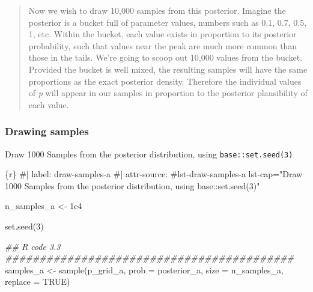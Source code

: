 \documentclass[
  letterpaper,
  DIV=11,
  numbers=noendperiod]{scrreprt}
\newenvironment{Shaded}{\begin{snugshade}}{\end{snugshade}}
\newcommand{\AttributeTok}[1]{\textcolor[rgb]{0.40,0.45,0.13}{#1}}
\newcommand{\CommentTok}[1]{\textcolor[rgb]{0.37,0.37,0.37}{#1}}
\newcommand{\ConstantTok}[1]{\textcolor[rgb]{0.56,0.35,0.01}{#1}}
\newcommand{\DecValTok}[1]{\textcolor[rgb]{0.68,0.00,0.00}{#1}}
\newcommand{\DocumentationTok}[1]{\textcolor[rgb]{0.37,0.37,0.37}{\textit{#1}}}
\newcommand{\FloatTok}[1]{\textcolor[rgb]{0.68,0.00,0.00}{#1}}
\newcommand{\FunctionTok}[1]{\textcolor[rgb]{0.28,0.35,0.67}{#1}}
\newcommand{\InformationTok}[1]{\textcolor[rgb]{0.37,0.37,0.37}{#1}}
\newcommand{\NormalTok}[1]{\textcolor[rgb]{0.00,0.23,0.31}{#1}}
\newcommand{\OtherTok}[1]{\textcolor[rgb]{0.00,0.23,0.31}{#1}}
\newcommand*\circled[1]{\tikz[baseline=(char.base)]{
          \node[shape=circle,draw,inner sep=1pt] (char) {{\scriptsize#1}};}}
\begin{document}
\begin{quote}
Now we wish to draw 10,000 samples from this posterior. Imagine the
posterior is a bucket full of parameter values, numbers such as 0.1,
0.7, 0.5, 1, etc. Within the bucket, each value exists in proportion to
its posterior probability, such that values near the peak are much more
common than those in the tails. We're going to scoop out 10,000 values
from the bucket. Provided the bucket is well mixed, the resulting
samples will have the same proportions as the exact posterior density.
Therefore the individual values of \emph{p} will appear in our samples
in proportion to the posterior plausibility of each value.
\end{quote}

\hypertarget{drawing-samples}{%
\subsubsection{Drawing samples}\label{drawing-samples}}

\begin{codelisting}[H]

\caption{Draw 1000 Samples from the posterior distribution, using
\texttt{base::set.seed(3)}}

\hypertarget{lst-draw-samples-a}{%
\label{lst-draw-samples-a}}%
\begin{Shaded}
\begin{Highlighting}[]
\InformationTok{\textasciigrave{}\textasciigrave{}\textasciigrave{}\{r\}}
\CommentTok{\#| label: draw{-}samples{-}a}
\CommentTok{\#| attr{-}source: \textquotesingle{}\#lst{-}draw{-}samples{-}a lst{-}cap="Draw 1000 Samples from the posterior distribution, using \textasciigrave{}base::set.seed(3)\textasciigrave{}"\textquotesingle{}}

\NormalTok{n\_samples\_a }\OtherTok{\textless{}{-}} \FloatTok{1e4}

\FunctionTok{set.seed}\NormalTok{(}\DecValTok{3}\NormalTok{) }\hspace*{\fill}\NormalTok{\circled{1}}

\DocumentationTok{\#\# R code 3.3 \#\#\#\#\#\#\#\#\#\#\#\#\#\#\#\#\#\#\#\#\#\#\#\#\#\#\#\#\#\#\#\#\#\#\#\#\#\#\#\#\#\#}
\NormalTok{samples\_a }\OtherTok{\textless{}{-}} \FunctionTok{sample}\NormalTok{(p\_grid\_a, }\AttributeTok{prob =}\NormalTok{ posterior\_a, }
                    \AttributeTok{size =}\NormalTok{ n\_samples\_a, }\AttributeTok{replace =} \ConstantTok{TRUE}\NormalTok{) }\hspace*{\fill}\NormalTok{\circled{2}}
\InformationTok{\textasciigrave{}\textasciigrave{}\textasciigrave{}}
\end{Highlighting}
\end{Shaded}

\end{codelisting}
\end{document}
